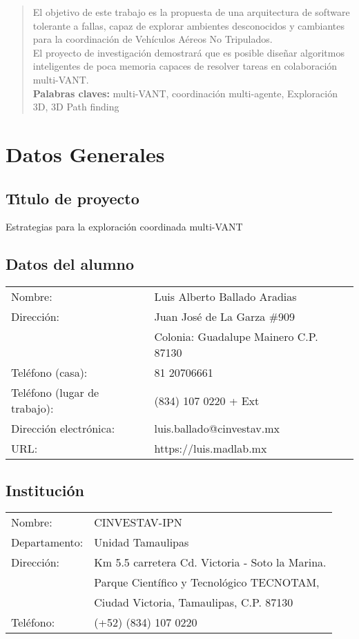 \documentclass[11pt,epsf,times]{article}
\begin{document}
\begin{abstract}
  El objetivo de este trabajo es la propuesta de una arquitectura de software tolerante a fallas, capaz de explorar ambientes desconocidos y cambiantes para la coordinación de Vehículos Aéreos No Tripulados.\\
  El proyecto de investigación demostrará que es posible diseñar algoritmos inteligentes de poca memoria capaces de resolver tareas en colaboración multi-VANT.
  \medskip \\
  
  \noindent \textbf{Palabras claves:} multi-VANT, coordinación multi-agente, Exploración 3D, 3D Path finding
  
\end{abstract}

\newpage
\section{Datos Generales}

\subsection{T\'{\i}tulo de proyecto}
Estrategias para la exploración coordinada multi-VANT
\subsection{Datos del alumno}
\begin{tabular}{ll} 
Nombre:  &          Luis Alberto Ballado Aradias \\
Direcci\'{o}n:   & Juan José de La Garza \#909\\
                 & Colonia: Guadalupe Mainero C.P. 87130\\
Tel\'{e}fono (casa):    & 81 20706661 \\
Tel\'{e}fono (lugar de trabajo):    & (834) 107 0220 + Ext  \\
Direcci\'{o}n electr\'{o}nica: & luis.ballado@cinvestav.mx \\
URL: & https://luis.madlab.mx
\end{tabular}
\subsection{Instituci\'{o}n}
\begin{tabular}{ll} 
Nombre:  &          CINVESTAV-IPN \\
Departamento:    &  Unidad Tamaulipas\\
Direcci\'{o}n:   &  Km 5.5 carretera Cd. Victoria - Soto la Marina.\\
                 &  Parque Científico y Tecnológico TECNOTAM,\\
                 &  Ciudad Victoria, Tamaulipas, C.P. 87130\\
Tel\'{e}fono:    & (+52) (834) 107 0220\\
\end{tabular}
\end{document}
